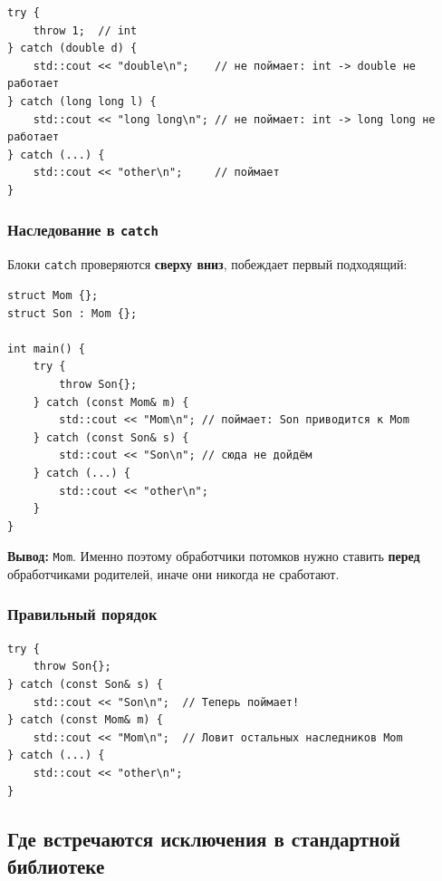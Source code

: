 \documentclass[a4paper,12pt]{article}
\begin{document}
\begin{lstlisting}
try {
    throw 1;  // int
} catch (double d) {
    std::cout << "double\n";    // не поймает: int -> double не работает
} catch (long long l) {
    std::cout << "long long\n"; // не поймает: int -> long long не работает
} catch (...) {
    std::cout << "other\n";     // поймает
}
\end{lstlisting}

\subsubsection{Наследование в \texttt{catch}}

Блоки \texttt{catch} проверяются \textbf{сверху вниз}, побеждает
первый подходящий:

\begin{lstlisting}
struct Mom {};
struct Son : Mom {};

int main() {
    try {
        throw Son{};
    } catch (const Mom& m) {
        std::cout << "Mom\n"; // поймает: Son приводится к Mom
    } catch (const Son& s) {
        std::cout << "Son\n"; // сюда не дойдём
    } catch (...) {
        std::cout << "other\n";
    }
}
\end{lstlisting}

\textbf{Вывод:} \texttt{Mom}. Именно поэтому обработчики потомков
нужно ставить \textbf{перед} обработчиками родителей, иначе они
никогда не сработают.

\subsubsection{Правильный порядок}

\begin{lstlisting}
try {
    throw Son{};
} catch (const Son& s) {
    std::cout << "Son\n";  // Теперь поймает!
} catch (const Mom& m) {
    std::cout << "Mom\n";  // Ловит остальных наследников Mom
} catch (...) {
    std::cout << "other\n";
}
\end{lstlisting}

\subsection{Где встречаются исключения в стандартной библиотеке}
\end{document}
